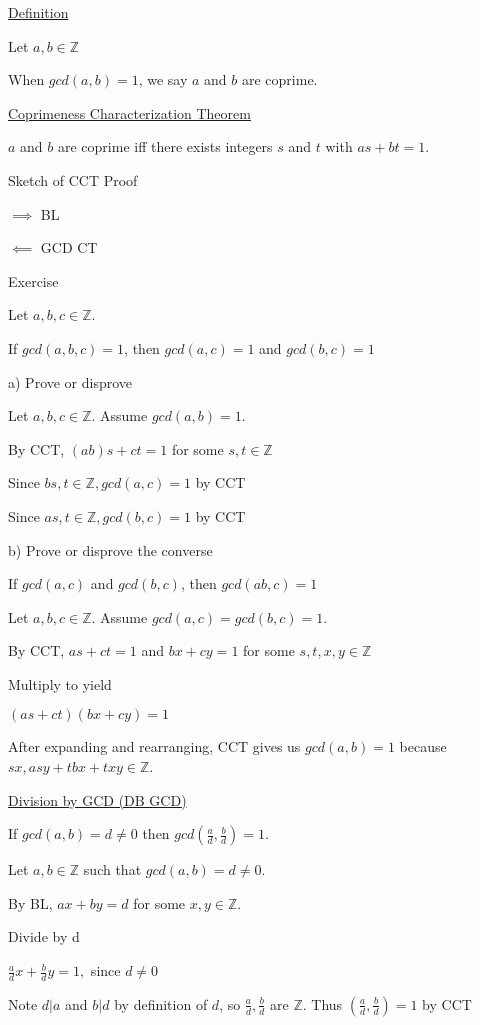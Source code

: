\documentclass{article}
\begin{document}
\underline{Definition}

Let $a,b \in \mathbb{Z}$

When $gcd(a,b) = 1$, we say $a$ and $b$ are coprime.

\underline{Coprimeness Characterization Theorem}

$a$ and $b$ are coprime iff there exists integers $s$ and $t$ with $as + bt = 1$.

Sketch of CCT Proof

$\implies$ BL

$\impliedby$ GCD CT

Exercise

Let $a,b,c \in \mathbb{Z}$.

If $gcd(a,b,c) = 1$, then $gcd(a,c) = 1$ and $gcd(b,c)=1$

a) Prove or disprove

Let $a,b,c \in \mathbb{Z}$. Assume $gcd(a,b)=1$.

By CCT, $(ab)s + ct = 1$ for some $s,t \in \mathbb{Z}$

Since $bs, t \in \mathbb{Z}, gcd(a,c) = 1$ by CCT

Since $as, t \in \mathbb{Z}, gcd(b,c) = 1$ by CCT

b) Prove or disprove the converse

If $gcd(a,c)$ and $gcd(b,c)$, then $gcd(ab,c)=1$

Let $a,b,c \in \mathbb{Z}$. Assume $gcd(a,c) = gcd(b,c)=1$.

By CCT, $as + ct = 1$ and $bx + cy = 1$ for some $s,t,x,y \in \mathbb{Z}$

Multiply to yield

$(as + ct)(bx + cy) = 1$

After expanding and rearranging, CCT gives us $gcd(a,b) = 1$ because $sx, asy + tbx + txy \in \mathbb{Z}$.

\underline{Division by GCD (DB GCD)}

If $gcd(a,b) = d \ne 0$ then $gcd(\frac{a}{d}, \frac{b}{d}) = 1$.

Let $a,b \in \mathbb{Z}$ such that $gcd(a,b) = d \ne 0$.

By BL, $ax + by = d$ for some $x,y \in \mathbb{Z}$.

Divide by d

$\frac{a}{d}x + \frac{b}{d}y = 1,$ since $d \ne 0$

Note $d \vert a$ and $b \vert d$ by definition of $d$, so $\frac{a}{d}, \frac{b}{d}$ are $\mathbb{Z}$. Thus $(\frac{a}{d}, \frac{b}{d}) =1 $ by CCT
\end{document}

